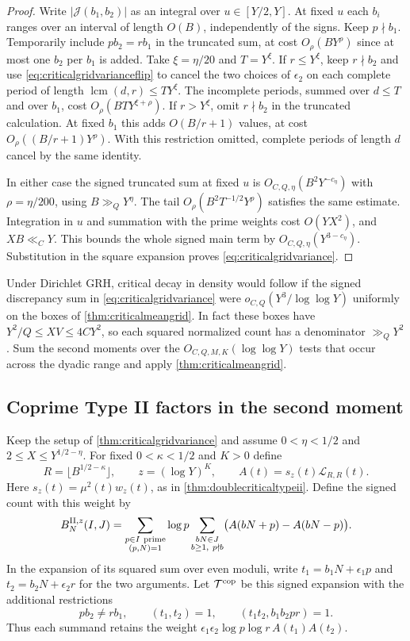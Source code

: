 \documentclass[11pt,a4paper]{article}
\numberwithin{equation}{section}
\begin{document}
\begin{proof}
Write $|\mathcal J(b_1,b_2)|$ as an integral over
$u\in[Y/2,Y]$. At fixed $u$ each $b_i$ ranges over
an interval of length $O(B)$, independently of the
signs. Keep $p\nmid b_1$. Temporarily include
$p b_2=r b_1$ in the truncated sum, at cost
$O_\rho(BY^\rho)$ since at most one $b_2$ per $b_1$
is added. Take $\xi=\eta/20$ and $T=Y^\xi$.
If $r\le Y^\xi$, keep $r\nmid b_2$ and use
\cref{eq:criticalgridvarianceflip} to cancel the
two choices of $\epsilon_2$ on each complete
period of length $\operatorname{lcm}(d,r)\le T Y^\xi$.
The incomplete periods, summed over $d\le T$ and
over $b_1$, cost $O_\rho(BT Y^{\xi+\rho})$.
If $r>Y^\xi$, omit $r\nmid b_2$ in the truncated
calculation. At fixed $b_1$ this adds $O(B/r+1)$
values, at cost $O_\rho((B/r+1)Y^\rho)$.
With this restriction omitted, complete periods of
length $d$ cancel by the same identity.

In either case the signed truncated sum at fixed $u$
is $O_{C,Q,\eta}(B^2Y^{-c_\eta})$ with
$\rho=\eta/200$, using $B\gg_Q Y^\eta$.
The tail $O_\rho(B^2 T^{-1/2}Y^\rho)$ satisfies the
same estimate. Integration in $u$ and summation with
the prime weights cost $O(Y X^2)$, and $XB\ll_C Y$.
This bounds the whole signed main term by
$O_{C,Q,\eta}(Y^{3-c_\eta})$. Substitution in the
square expansion proves \cref{eq:criticalgridvariance}.
\end{proof}

Under Dirichlet GRH, critical decay in density would
follow if the signed discrepancy sum in
\cref{eq:criticalgridvariance} were
$o_{C,Q}(Y^3/\log\log Y)$ uniformly on the boxes of
\cref{thm:criticalmeangrid}. In fact these boxes
have $Y^2/Q\le XV\le4CY^2$, so each squared normalized
count has a denominator $\gg_Q Y^2$. Sum the second
moments over the $O_{C,Q,M,K}(\log\log Y)$ tests
that occur across the dyadic range and apply
\cref{thm:criticalmeangrid}.

\subsection{Coprime Type II factors in the second moment}

Keep the setup of \cref{thm:criticalgridvariance} and
assume $0<\eta<1/2$ and $2\le X\le Y^{1/2-\eta}$.
For fixed $0<\kappa<1/2$ and $K>0$ define
\[
 R=\lfloor B^{1/2-\kappa}\rfloor,\qquad
 z=(\log Y)^K,\qquad A(t)=s_z(t)\mathcal L_{R,R}(t).
\]
Here $s_z(t)=\mu^2(t)w_z(t)$, as in
\cref{thm:doublecriticaltypeii}. Define the signed
count with this weight by
\[
 B_N^{\mathrm{II},z}(I,J)=
 \sum_{\substack{p\in I\ {\rm prime}\\(p,N)=1}}\log p
 \sum_{\substack{bN\in J\\b\ge1,\ p\nmid b}}
           \bigl(A(bN+p)-A(bN-p)\bigr).
\]
In the expansion of its squared sum over even moduli,
write $t_1=b_1N+\epsilon_1p$ and
$t_2=b_2N+\epsilon_2r$ for the two arguments.
Let $\mathcal T^{\rm cop}$ be this signed expansion
with the additional restrictions
\begin{equation}
 p b_2\ne r b_1,\qquad
 (t_1,t_2)=1,\qquad (t_1t_2,b_1b_2pr)=1 .
 \label{eq:criticalgridcoprimeconditions}
\end{equation}
Thus each summand retains the weight
$\epsilon_1\epsilon_2\log p\log r\, A(t_1)A(t_2)$.
\end{document}

